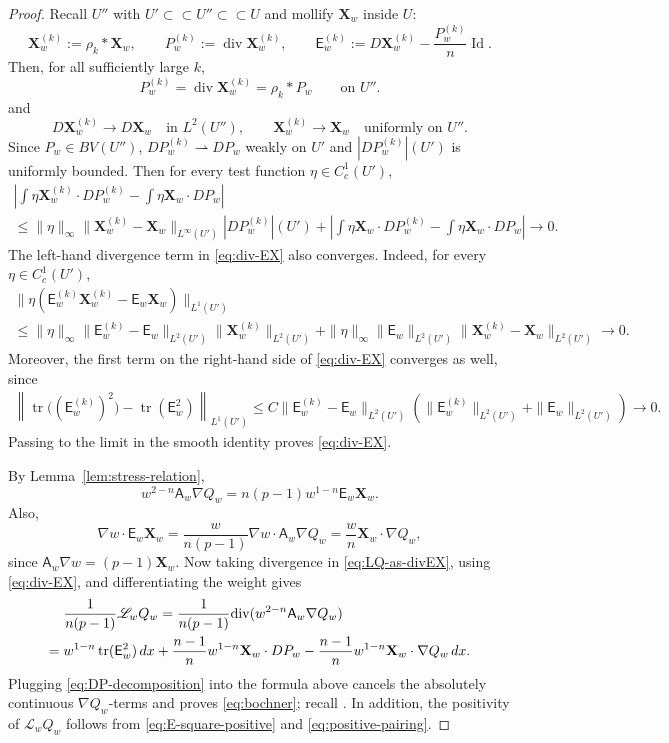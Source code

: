 \documentclass[reqno,12pt]{amsart}
\numberwithin{equation}{section}
\theoremstyle{remark}
\newcommand{\dd}{\,d}
\newcommand{\tr}{\operatorname{tr}}
\newcommand{\Id}{\operatorname{Id}}
\newcommand{\Xbf}{\mathbf X}
\newcommand{\Lscr}{\mathscr L}
\newcommand{\weakto}{\rightharpoonup}
\begin{document}
\begin{proof}
Recall $U''$ with $U'\subset\subset U''\subset\subset U$ and mollify $\Xbf_w$ inside $U$:
$$
\Xbf_w^{(k)}:=\rho_k*\Xbf_w,
\qquad P_w^{(k)}:=\operatorname{div}\Xbf_w^{(k)},
\qquad \mathsf E_w^{(k)}:=D\Xbf_w^{(k)}-\frac{P_w^{(k)}}n\Id.
$$
Then, for all sufficiently large $k$,
$$
P_w^{(k)}=\operatorname{div}\Xbf_w^{(k)} =\rho_k*P_w \qquad\text{on }U''.
$$
and
$$
 D\Xbf_w^{(k)}\to D\Xbf_w\quad\text{in }L^2(U''),
 \qquad  \Xbf_w^{(k)}\to\Xbf_w\quad\text{uniformly on }U''.
$$
Since $P_w\in BV(U'')$, $DP_w^{(k)}\weakto DP_w$ weakly  on $U'$ and $|DP_w^{(k)}|(U')$ is uniformly bounded.  Then for every test function $\eta\in C_c^1(U')$,
\begin{multline*}
 \left| \int\eta\Xbf_w^{(k)}\cdot DP_w^{(k)} -\int\eta\Xbf_w\cdot DP_w \right|\\
\le  \|\eta\|_\infty \|\Xbf_w^{(k)}-\Xbf_w\|_{L^\infty(U')} |DP_w^{(k)}|(U') +  \left| \int \eta\Xbf_w\cdot DP_w^{(k)}  -\int \eta\Xbf_w\cdot DP_w \right| \to 0.
\end{multline*}
The left-hand divergence term in \eqref{eq:div-EX} also converges.  Indeed, for every $\eta\in C_c^1(U')$,
\begin{multline*}
\|\eta(\mathsf E_w^{(k)}\Xbf_w^{(k)}-\mathsf E_w\Xbf_w)\|_{L^1(U')}\\
\le  \|\eta\|_\infty
\|\mathsf E_w^{(k)}-\mathsf E_w\|_{L^2(U')}
\|\Xbf_w^{(k)}\|_{L^2(U')}+
\|\eta\|_\infty \|\mathsf E_w\|_{L^2(U')}\|\Xbf_w^{(k)}-\Xbf_w\|_{L^2(U')} \to 0.
\end{multline*}
Moreover, the first term on the right-hand side of  \eqref{eq:div-EX} converges as well, since
\begin{multline*}
\left\| \tr\bigl((\mathsf E_w^{(k)})^2\bigr)-\tr(\mathsf E_w^2) \right\|_{L^1(U')} 
\le C\|\mathsf E_w^{(k)}-\mathsf E_w\|_{L^2(U')}
\left( \|\mathsf E_w^{(k)}\|_{L^2(U')}+\|\mathsf E_w\|_{L^2(U')}\right) \to 0.
\end{multline*}
Passing to the limit in the smooth identity proves \eqref{eq:div-EX}.

By Lemma~\ref{lem:stress-relation},
\begin{equation}\label{eq:LQ-as-divEX}
w^{2-n}\mathsf A_w\nabla Q_w =n(p-1)w^{1-n}\mathsf E_w\Xbf_w.
\end{equation}
Also,
$$
 \nabla w\cdot\mathsf E_w\Xbf_w
 =\frac{w}{n(p-1)}\nabla w\cdot\mathsf A_w\nabla Q_w
 =\frac wn\Xbf_w\cdot\nabla Q_w,
$$
since $\mathsf A_w\nabla w=(p-1)\Xbf_w$.  Now taking divergence in \eqref{eq:LQ-as-divEX}, using \eqref{eq:div-EX}, and differentiating the weight gives
\begin{align*}
 &\frac1{n(p-1)}\Lscr_wQ_w = \frac{1}{n(p-1)}{\rm div}(w^{2-n}\mathsf A_w\nabla Q_w ) \\
 ={}&w^{1-n}\tr(\mathsf E_w^2)\dd x
 +\frac{n-1}{n}w^{1-n}\Xbf_w\cdot DP_w -\frac{n-1}{n}w^{1-n} \Xbf_w\cdot\nabla Q_w\dd x.
\end{align*}
Plugging  \eqref{eq:DP-decomposition} into the formula above cancels the absolutely continuous $\nabla Q_w$-terms and proves \eqref{eq:bochner}; recall \cite{MW2024}.  In addition, the positivity of  $\Lscr_w Q_w$ follows from \eqref{eq:E-square-positive} and \eqref{eq:positive-pairing}.
\end{proof}
\end{document}
